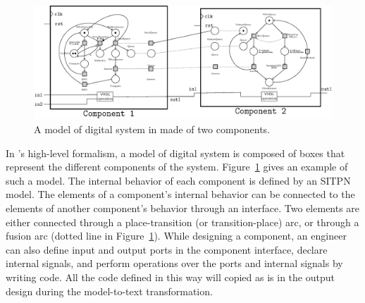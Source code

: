 \documentclass[pdflatex,sn-mathphys]{sn-jnl}%
\theoremstyle{thmstyleone}%
\theoremstyle{thmstyletwo}%
\theoremstyle{thmstylethree}%
\begin{document}
\begin{figure}[H]
\centering
\includegraphics[keepaspectratio=true,width=\textwidth]{abs-model.eps}
\caption[An example of model of digital system in \hilecop{}.]{A model
  of digital system in \hilecop{} made of two components.}
\label{fig:abs-model}
\end{figure}

In \hilecop{}'s high-level formalism, a model of digital system is
composed of boxes that represent the different components of the
system. Figure~\ref{fig:abs-model} gives an example of such a model.
The internal behavior of each component is defined by an SITPN model.
The elements of a component's internal behavior can be connected to
the elements of another component's behavior through an interface. Two
elements are either connected through a place-transition (or
transition-place) arc, or through a fusion arc (dotted line in
Figure~\ref{fig:abs-model}). While designing a component, an engineer
can also define input and output ports in the component interface,
declare internal signals, and perform operations over the ports and
internal signals by writing \vhdl{} code. All the \vhdl{} code defined
in this way will copied as is in the output \vhdl{} design during the
model-to-text transformation.




\end{document}
